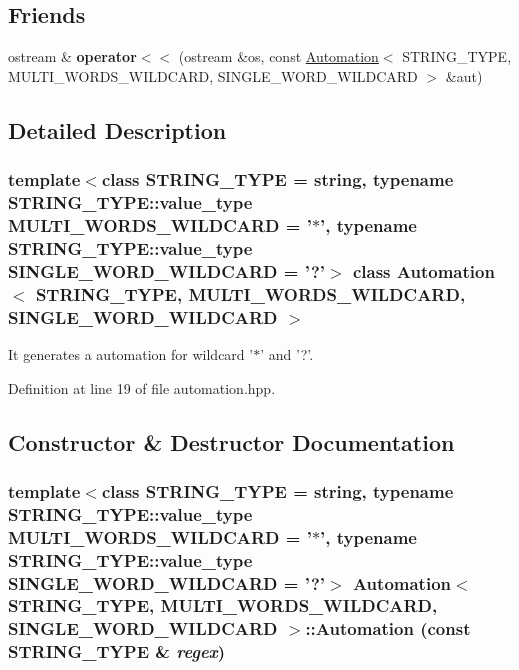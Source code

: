 \subsection*{Friends}
\begin{CompactItemize}
\item 
\hypertarget{classAutomation_4ee8fafddfce3e52f4e01f12969a5b38}{
ostream \& \textbf{operator$<$$<$} (ostream \&os, const \hyperlink{classAutomation}{Automation}$<$ STRING\_\-TYPE, MULTI\_\-WORDS\_\-WILDCARD, SINGLE\_\-WORD\_\-WILDCARD $>$ \&aut)}
\label{classAutomation_4ee8fafddfce3e52f4e01f12969a5b38}

\end{CompactItemize}


\subsection{Detailed Description}
\subsubsection*{template$<$class STRING\_\-TYPE = string, typename STRING\_\-TYPE::value\_\-type MULTI\_\-WORDS\_\-WILDCARD = '$\ast$', typename STRING\_\-TYPE::value\_\-type SINGLE\_\-WORD\_\-WILDCARD = '?'$>$ class Automation$<$ STRING\_\-TYPE, MULTI\_\-WORDS\_\-WILDCARD, SINGLE\_\-WORD\_\-WILDCARD $>$}

It generates a automation for wildcard '$\ast$' and '?'. 

Definition at line 19 of file automation.hpp.

\subsection{Constructor \& Destructor Documentation}
\hypertarget{classAutomation_eab5e3b7894377708216a3f4f2573a16}{
\subsubsection[{Automation}]{\setlength{\rightskip}{0pt plus 5cm}template$<$class STRING\_\-TYPE  = string, typename STRING\_\-TYPE::value\_\-type MULTI\_\-WORDS\_\-WILDCARD = '$\ast$', typename STRING\_\-TYPE::value\_\-type SINGLE\_\-WORD\_\-WILDCARD = '?'$>$ {\bf Automation}$<$ STRING\_\-TYPE, MULTI\_\-WORDS\_\-WILDCARD, SINGLE\_\-WORD\_\-WILDCARD $>$::{\bf Automation} (const STRING\_\-TYPE \& {\em regex})}}
\label{classAutomation_eab5e3b7894377708216a3f4f2573a16}


